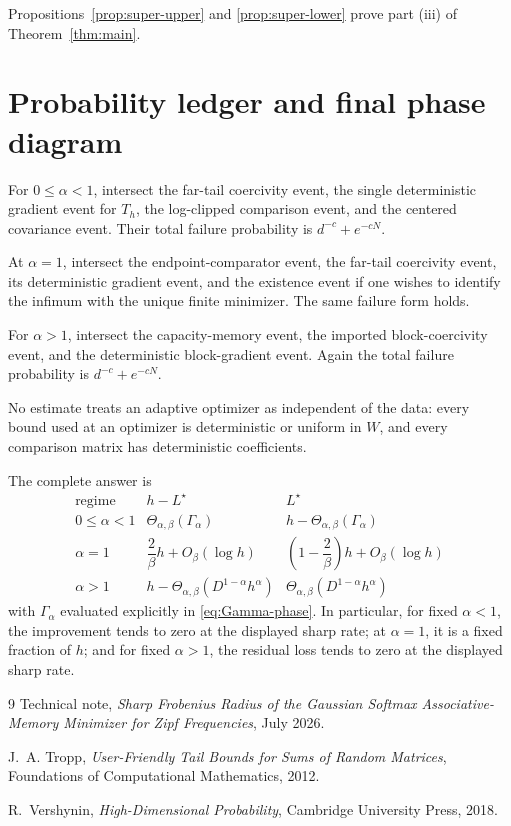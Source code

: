 \documentclass[11pt]{article}
\theoremstyle{remark}
\begin{document}
Propositions~\ref{prop:super-upper} and
\ref{prop:super-lower} prove part (iii) of
Theorem~\ref{thm:main}.

\section{Probability ledger and final phase diagram}
\label{sec:probability}

For \(0\leq\alpha<1\), intersect the far-tail coercivity event, the
single deterministic gradient event for \(T_h\), the log-clipped
comparison event, and the centered covariance event.  Their total
failure probability is \(d^{-c}+e^{-cN}\).

At \(\alpha=1\), intersect the endpoint-comparator event, the
far-tail coercivity event, its deterministic gradient event, and the
existence event if one wishes to identify the infimum with the unique
finite minimizer.  The same failure form holds.

For \(\alpha>1\), intersect the capacity-memory event, the imported
block-coercivity event, and the deterministic block-gradient event.
Again the total failure probability is \(d^{-c}+e^{-cN}\).

No estimate treats an adaptive optimizer as independent of the data:
every bound used at an optimizer is deterministic or uniform in \(W\),
and every comparison matrix has deterministic coefficients.

The complete answer is
\[
\boxed{
\begin{array}{c|c|c}
\text{regime}
&h-L^\star
&L^\star\\ \hline
0\leq\alpha<1
&\Theta_{\alpha,\beta}(\Gamma_\alpha)
&h-\Theta_{\alpha,\beta}(\Gamma_\alpha)\\[1mm]
\alpha=1
&\dfrac2\beta h+O_\beta(\log h)
&\left(1-\dfrac2\beta\right)h+O_\beta(\log h)\\[2mm]
\alpha>1
&h-\Theta_{\alpha,\beta}(D^{1-\alpha}h^\alpha)
&\Theta_{\alpha,\beta}(D^{1-\alpha}h^\alpha)
\end{array}}
\]
with \(\Gamma_\alpha\) evaluated explicitly in
\eqref{eq:Gamma-phase}.  In particular, for fixed
\(\alpha<1\), the improvement tends to zero at the displayed sharp
rate; at \(\alpha=1\), it is a fixed fraction of \(h\); and for fixed
\(\alpha>1\), the residual loss tends to zero at the displayed sharp
rate.

\begin{thebibliography}{9}
Technical note,
\emph{Sharp Frobenius Radius of the Gaussian Softmax
Associative-Memory Minimizer for Zipf Frequencies},
July 2026.

J.~A. Tropp,
\emph{User-Friendly Tail Bounds for Sums of Random Matrices},
Foundations of Computational Mathematics, 2012.

R.~Vershynin,
\emph{High-Dimensional Probability},
Cambridge University Press, 2018.
\end{thebibliography}
\end{document}
